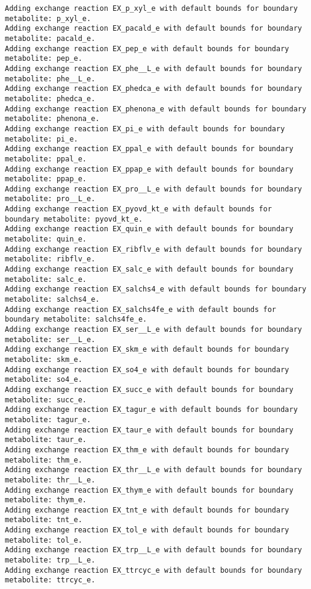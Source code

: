 \documentclass[
  letterpaper,
  DIV=11,
  numbers=noendperiod]{scrartcl}
\begin{document}
\begin{verbatim}
Adding exchange reaction EX_p_xyl_e with default bounds for boundary metabolite: p_xyl_e.
Adding exchange reaction EX_pacald_e with default bounds for boundary metabolite: pacald_e.
Adding exchange reaction EX_pep_e with default bounds for boundary metabolite: pep_e.
Adding exchange reaction EX_phe__L_e with default bounds for boundary metabolite: phe__L_e.
Adding exchange reaction EX_phedca_e with default bounds for boundary metabolite: phedca_e.
Adding exchange reaction EX_phenona_e with default bounds for boundary metabolite: phenona_e.
Adding exchange reaction EX_pi_e with default bounds for boundary metabolite: pi_e.
Adding exchange reaction EX_ppal_e with default bounds for boundary metabolite: ppal_e.
Adding exchange reaction EX_ppap_e with default bounds for boundary metabolite: ppap_e.
Adding exchange reaction EX_pro__L_e with default bounds for boundary metabolite: pro__L_e.
Adding exchange reaction EX_pyovd_kt_e with default bounds for boundary metabolite: pyovd_kt_e.
Adding exchange reaction EX_quin_e with default bounds for boundary metabolite: quin_e.
Adding exchange reaction EX_ribflv_e with default bounds for boundary metabolite: ribflv_e.
Adding exchange reaction EX_salc_e with default bounds for boundary metabolite: salc_e.
Adding exchange reaction EX_salchs4_e with default bounds for boundary metabolite: salchs4_e.
Adding exchange reaction EX_salchs4fe_e with default bounds for boundary metabolite: salchs4fe_e.
Adding exchange reaction EX_ser__L_e with default bounds for boundary metabolite: ser__L_e.
Adding exchange reaction EX_skm_e with default bounds for boundary metabolite: skm_e.
Adding exchange reaction EX_so4_e with default bounds for boundary metabolite: so4_e.
Adding exchange reaction EX_succ_e with default bounds for boundary metabolite: succ_e.
Adding exchange reaction EX_tagur_e with default bounds for boundary metabolite: tagur_e.
Adding exchange reaction EX_taur_e with default bounds for boundary metabolite: taur_e.
Adding exchange reaction EX_thm_e with default bounds for boundary metabolite: thm_e.
Adding exchange reaction EX_thr__L_e with default bounds for boundary metabolite: thr__L_e.
Adding exchange reaction EX_thym_e with default bounds for boundary metabolite: thym_e.
Adding exchange reaction EX_tnt_e with default bounds for boundary metabolite: tnt_e.
Adding exchange reaction EX_tol_e with default bounds for boundary metabolite: tol_e.
Adding exchange reaction EX_trp__L_e with default bounds for boundary metabolite: trp__L_e.
Adding exchange reaction EX_ttrcyc_e with default bounds for boundary metabolite: ttrcyc_e.

\end{verbatim}
\end{document}
